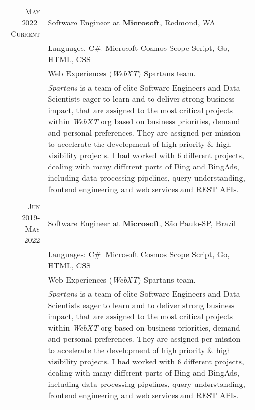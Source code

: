 \documentclass[a4paper,10pt]{article} %
\begin{document}
\begin{tabular}{r|p{11cm}}
\textsc{May 2022-Current} & Software Engineer at \textbf{Microsoft}, Redmond, WA \emph{}\\
& \footnotesize{Languages: C\#, Microsoft Cosmos Scope Script, Go, HTML, CSS}\\
       & \footnotesize{Web Experiences (\emph{WebXT}) Spartans team.} \\
       & \footnotesize{\emph{Spartans} is a team of elite Software Engineers and Data Scientists eager to learn and to deliver strong business impact, that are assigned to the most critical projects within \emph{WebXT} org based on business priorities, demand and personal preferences. They are assigned per mission to accelerate the development of high priority \& high visibility projects. I had worked with 6 different projects, dealing with many different parts of Bing and BingAds, including data processing pipelines, query understanding, frontend engineering and web services and REST APIs.} \\
       \multicolumn{2}{c}{} \\
       

\textsc{Jun 2019-May 2022} & Software Engineer at \textbf{Microsoft}, São Paulo-SP, Brazil \emph{}\\
& \footnotesize{Languages: C\#, Microsoft Cosmos Scope Script, Go, HTML, CSS}\\
       & \footnotesize{Web Experiences (\emph{WebXT}) Spartans team.} \\
       & \footnotesize{\emph{Spartans} is a team of elite Software Engineers and Data Scientists eager to learn and to deliver strong business impact, that are assigned to the most critical projects within \emph{WebXT} org based on business priorities, demand and personal preferences. They are assigned per mission to accelerate the development of high priority \& high visibility projects. I had worked with 6 different projects, dealing with many different parts of Bing and BingAds, including data processing pipelines, query understanding, frontend engineering and web services and REST APIs.} \\
       \multicolumn{2}{c}{} \\
       


\end{tabular}
\end{document}
